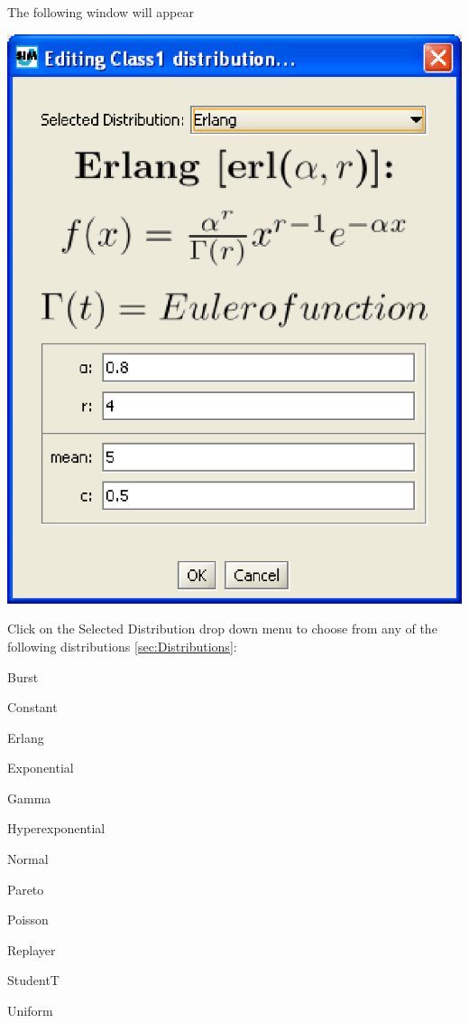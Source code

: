 The following window will appear
\begin{center}
\includegraphics[scale=.5]{img/jsim/erlang.eps}
\end{center}

Click on the Selected Distribution drop down menu to choose from any of the following
distributions \autoref{sec:Distributions}:
\begin{itemize*}
    \item Burst
    \item Constant
    \item Erlang
    \item Exponential
    \item Gamma
    \item Hyperexponential
    \item Normal
    \item Pareto
    \item Poisson
    \item Replayer
    \item StudentT
    \item Uniform
\end{itemize*}

